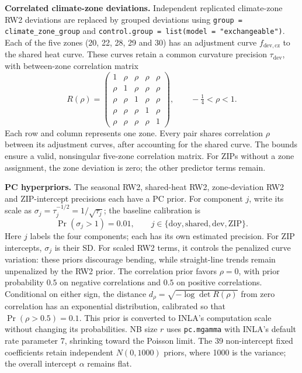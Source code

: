 \documentclass[10pt]{article}
\begin{document}
\textbf{Correlated climate-zone deviations.}
Independent replicated climate-zone RW2 deviations are replaced by grouped
deviations using \texttt{group = climate\_zone\_group} and
\texttt{control.group = list(model = "exchangeable")}.
Each of the five zones (20, 22, 28, 29 and 30) has an adjustment curve
$f_{\mathrm{dev},\mathrm{cz}}$ to the shared heat curve. These curves retain
a common curvature precision $\tau_{\mathrm{dev}}$, with between-zone
correlation matrix
\[
R(\rho)=
\begin{pmatrix}
1&\rho&\rho&\rho&\rho\\
\rho&1&\rho&\rho&\rho\\
\rho&\rho&1&\rho&\rho\\
\rho&\rho&\rho&1&\rho\\
\rho&\rho&\rho&\rho&1
\end{pmatrix},
\qquad -\tfrac14<\rho<1.
\]
Each row and column represents one zone. Every pair shares correlation
$\rho$ between its adjustment curves, after accounting for the shared
curve. The bounds ensure a valid, nonsingular five-zone correlation matrix.
For ZIPs without a zone assignment, the zone deviation is zero; the other
predictor terms remain.

\textbf{PC hyperpriors.}
The seasonal RW2, shared-heat RW2, zone-deviation RW2 and ZIP-intercept
precisions each have a PC prior. For component $j$, write its scale as
$\sigma_j=\tau_j^{-1/2}=1/\sqrt{\tau_j}$; the baseline calibration is
\[
\Pr(\sigma_j>1)=0.01,\qquad
j\in\{\mathrm{doy},\mathrm{shared},\mathrm{dev},\mathrm{ZIP}\}.
\]
Here $j$ labels the four components; each has its own estimated precision.
For ZIP intercepts, $\sigma_j$ is their SD. For scaled RW2 terms, it controls
the penalized curve variation: these priors discourage bending, while
straight-line trends remain unpenalized by the RW2 prior.
The correlation prior favors $\rho=0$, with prior probability $0.5$ on
negative correlations and $0.5$ on positive correlations. Conditional on
either sign, the distance $d_\rho=\sqrt{-\log\det R(\rho)}$ from zero
correlation has an exponential distribution, calibrated so that
$\Pr(\rho>0.5)=0.1$. This prior is converted to INLA's computation scale
without changing its probabilities.
NB size $r$ uses \texttt{pc.mgamma} with INLA's default rate parameter 7,
shrinking toward the Poisson limit. The 39 non-intercept fixed coefficients
retain independent $N(0,1000)$ priors, where 1000 is the variance;
the overall intercept $\alpha$ remains flat.

\newpage
\end{document}
